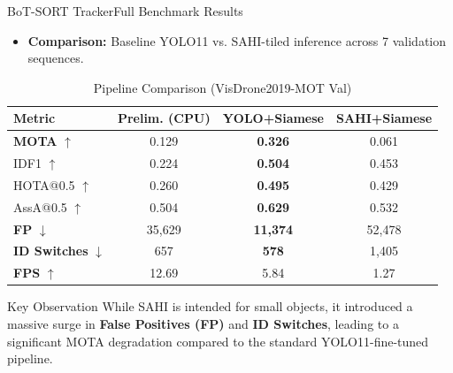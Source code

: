 \documentclass[10pt]{beamer}
\begin{document}
\begin{frame}{BoT-SORT Tracker}{Full Benchmark Results}
    \begin{itemize}
        \item \textbf{Comparison:} Baseline YOLO11 vs. SAHI-tiled inference across 7 validation sequences.
    \end{itemize}

    \begin{table}
        \scriptsize
        \centering
        \caption{Pipeline Comparison (VisDrone2019-MOT Val)}
        \label{tab:pipeline_global}
        \begin{tabular}{lccc}
            \toprule
            \textbf{Metric} & Prelim. (CPU) & \textbf{YOLO+Siamese} & SAHI+Siamese \\
            \midrule
            \textbf{MOTA} $\uparrow$ & 0.129 & \textbf{0.326} & 0.061 \\
            IDF1 $\uparrow$ & 0.224 & \textbf{0.504} & 0.453 \\
            HOTA@0.5 $\uparrow$ & 0.260 & \textbf{0.495} & 0.429 \\
            AssA@0.5 $\uparrow$ & 0.504 & \textbf{0.629} & 0.532 \\
            \midrule
            \textbf{FP} $\downarrow$ & 35,629 & \textbf{11,374} & 52,478 \\
            \textbf{ID Switches} $\downarrow$ & 657 & \textbf{578} & 1,405 \\
            \midrule
            \textbf{FPS} $\uparrow$ & 12.69 & 5.84 & 1.27 \\
            \bottomrule
        \end{tabular}
    \end{table}

    \begin{block}{Key Observation}
        \small
        While SAHI is intended for small objects, it introduced a massive surge in \textbf{False Positives (FP)} and \textbf{ID Switches}, leading to a significant MOTA degradation compared to the standard YOLO11-fine-tuned pipeline.
    \end{block}
\end{frame}







\end{document}
